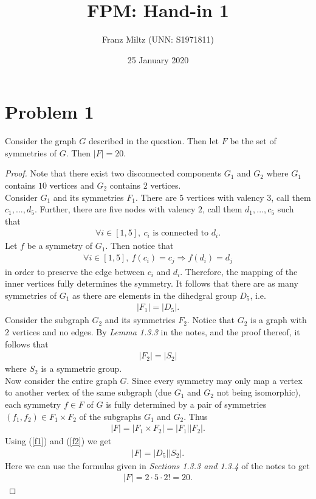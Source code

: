 \documentclass{article}
\begin{document}
\title{FPM: Hand-in 1}
\author{Franz Miltz (UNN: S1971811)}
\date{25 January 2020}
\maketitle

\section*{Problem 1}
\begin{claim}
  Consider the graph $G$ described in the question. Then
  let $F$ be the set of symmetries of $G$. Then $|F|=20$.
\end{claim}
\begin{proof}
   Note that there exist two disconnected components
   $G_1$ and $G_2$ where $G_1$ contains $10$ vertices
   and $G_2$ contains $2$ vertices. \\
   Consider $G_1$ and its symmetries $F_1$. There are $5$ vertices with valency
   $3$, call them $c_1, ..., d_5$. Further, there are 
   five nodes with valency $2$, call them $d_1, ..., c_5$
   such that
   \begin{align*}
      \forall i\in[1,5],\: c_i \text{ is connected to } d_i.
   \end{align*}
   Let $f$ be a symmetry of $G_1$. Then notice that
   \begin{align*}
      \forall i\in[1,5],\: f(c_i)=c_j \Rightarrow f(d_i)=d_j
   \end{align*}
   in order to preserve the edge between $c_i$ and $d_i$.
   Therefore, the mapping of the inner vertices fully
   determines the symmetry. It follows that there are as
   many symmetries of $G_1$ as there are elements in the
   dihedgral group $D_5$, i.e.
   \begin{align}
      \label{f1}
      |F_1|=|D_5|. 
   \end{align}
   Consider the subgraph $G_2$ and its symmetries $F_2$.
   Notice that $G_2$ is a graph with $2$ vertices and
   no edges. By \emph{Lemma 1.3.3} in the notes, and the
   proof thereof, it follows that
   \begin{align}
      \label{f2}
      |F_2|=|S_2|
   \end{align}
   where $S_2$ is a symmetric group.\\
   Now consider the entire graph $G$. Since every symmetry may
   only map a vertex to another vertex of the same subgraph
   (due $G_1$ and $G_2$ not being isomorphic),
   each symmetry $f\in F$ of $G$ is fully determined by
   a pair of symmetries $(f_1, f_2)\in F_1\times F_2$ of
   the subgraphs $G_1$ and $G_2$. Thus
   \begin{align*}
      |F| = |F_1\times F_2| = |F_1||F_2|.
   \end{align*}
   Using (\ref{f1}) and (\ref{f2}) we get
   \begin{align*}
      |F| = |D_5||S_2|.
   \end{align*}
   Here we can use the formulas given in \emph{Sections 1.3.3
   and 1.3.4} of the notes to get
   \begin{align*}
      |F| = 2\cdot 5\cdot 2! = 20.
   \end{align*}
\end{proof}
\end{document}
